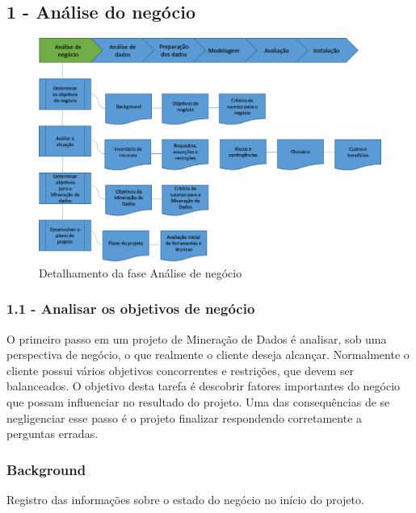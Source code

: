 \newpage

\subsection*{1 - Análise do negócio}


\begin{figure}[H]
	\includegraphics[scale=0.8]{img/CRISP-DM-Analise-de-negocio.png}
	\caption{Detalhamento da fase Análise de negócio}
	\label{img:CRISP-DM-analise-de-negocio}
\end{figure}


\subsubsection*{\textbf{1.1 - Analisar os objetivos de negócio}}

O primeiro passo em um projeto de Mineração de Dados é analisar, sob uma perspectiva de negócio, o que realmente o cliente deseja alcançar. Normalmente o cliente possui vários objetivos concorrentes e restrições, que devem ser balanceados. O objetivo desta tarefa é descobrir fatores importantes do negócio que possam influenciar no resultado do projeto. Uma das consequências de se negligenciar esse passo é o projeto finalizar respondendo corretamente a perguntas erradas.

\subsubsection*{Background}

Registro das informações sobre o estado do negócio no início do projeto.

